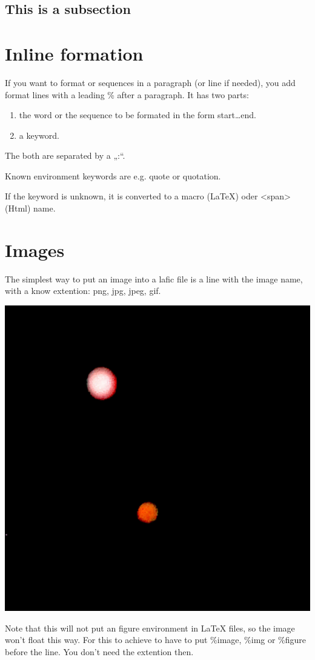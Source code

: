 \documentclass{scrartcl}
\begin{document}
\subsection{This is a subsection}

\section{Inline formation}

If you want to format \xspace or sequences in a paragraph (or
line if needed), you add format lines with a leading \% after
a paragraph. It has two parts:

\begin{enumerate}
\item the word or the sequence to be formated in the form
start…end. 
\item a keyword.

\end{enumerate}

The both are separated by a „:“.

Known environment keywords are e.g. quote or quotation.

If the keyword is unknown, it is converted to a macro
(LaTeX) oder <span> (Html) name.

\section{Images}

The simplest way to put an image into a lafic file is a
line with the image name, with a know extention: png, jpg,
jpeg, gif.

\includegraphics[width=.50\linewidth]{Image.png}

Note that this will not put an figure environment in \LaTeX
files, so the image won't float this way. For this to
achieve to have to put \%image, \%img or \%figure before the
line. You don't need the extention then.
\end{document}
